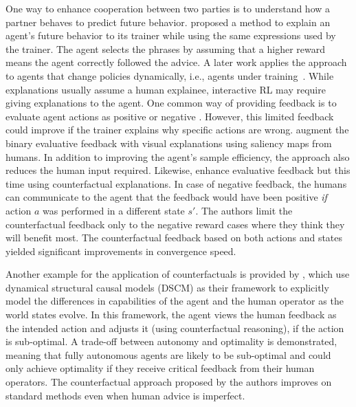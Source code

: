 \documentclass[twoside,11pt]{article}
\begin{document}
One way to enhance cooperation between two parties is to understand how a partner behaves to predict future behavior. \citet{fukuchi2017autonomous} proposed a method to explain an agent's future behavior to its trainer while using the same expressions used by the trainer. The agent selects the phrases by assuming that a higher reward means the agent correctly followed the advice. A later work applies the approach to agents that change policies dynamically, i.e., agents under training~\citep{fukuchi2017application}. While explanations usually assume a human explainee, interactive RL may require giving explanations to the agent. One common way of providing feedback is to evaluate agent actions as positive or negative \citep{arakawa:18,Knox:2008:TAMER,knox:13,macglashan2017interactive}. However, this limited feedback could improve if the trainer explains why specific actions are wrong. \citet{guan2020explanation} augment the binary evaluative feedback with visual explanations using saliency maps from humans. In addition to improving the agent's sample efficiency, the approach also reduces the human input required.  Likewise, \citet{Karalus:2021:HITL-counterfactuals} enhance evaluative feedback but this time using counterfactual explanations. In case of negative feedback, the humans can communicate to the agent that the feedback would have been positive \emph{if} action $a$ was performed in a different state $s'$. The authors limit the counterfactual feedback only to the negative reward cases where they think they will benefit most. The counterfactual feedback based on both actions and states yielded significant improvements in convergence speed. 

Another example for the application of counterfactuals is provided by \citet{Pearl:2009:Causality}, which use dynamical structural causal models (DSCM) as their framework to explicitly model the differences in capabilities of the agent and the human operator as the world states evolve. In this framework, the agent views the human feedback as the intended action and adjusts it (using counterfactual reasoning), if the action is sub-optimal. A trade-off between autonomy and optimality is demonstrated, meaning that fully autonomous agents are likely to be sub-optimal and could only achieve optimality if they receive critical feedback from their human operators. The counterfactual approach proposed by the authors improves on standard methods even when human advice is imperfect.
\end{document}
